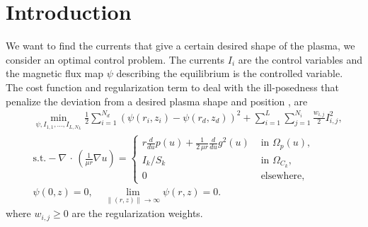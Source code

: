 \section{Introduction}\label{sec:MC}





We want to find the currents that give a certain desired shape of the plasma, we consider an optimal control problem. The currents $I_i$ are the control variables and the magnetic flux map $\psi$ describing the equilibrium is the controlled variable. The cost function and regularization term to deal with the ill-posedness that penalize the deviation from a desired plasma shape and position \cite{CEDRES}, are
\begin{align}
    &\min_{\psi,I_{1,1},\ldots, I_{L,N_L}} \frac{1}{2}\sum_{i=1}^{N_d}\left(\psi (r_i,z_i) - \psi(r_{d},z_d)\right)^2 + \sum_{i=1}^L\sum_{j=1}^{N_i}\frac{w_{i,j}}{2}I_{i,j}^2,\\
    & \text{s.t.}  -\nabla\,\cdot\,\left(\frac{1}{\mu r}\nabla u\right) = \left\{ \begin{array}{ll}
r\frac{d}{d u} p(u) + \frac{1}{2\,\mu r} \frac{d}{d u} g^2(u) & \text{ in } \Omega_p(u), \\
I_k/S_k & \text{ in } \Omega_{C_k}, \\
0 & \text{ elsewhere, } 
\end{array}\right.\\
& \psi(0,z) = 0,\quad \lim_{\|(r,z)\|\rightarrow \infty}\psi(r,z) = 0.
\end{align}
%
where $w_{i,j}\ge 0$ are the regularization weights.


